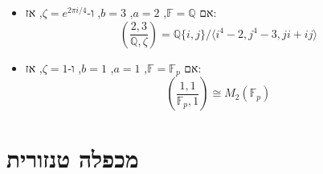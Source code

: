 \documentclass{tstextbook}
\begin{document}
\begin{example}
  \begin{itemize}
    \item אם \(\mathbb{F} = \mathbb{Q}\), \(a = 2\), \(b = 3\), ו-\(\zeta = e^{2\pi i / 4}\), אז:
$$\left( \frac{2, 3}{\mathbb{Q}, \zeta} \right) = \mathbb{Q}\{i, j\} / \langle i^4 - 2, j^4 - 3, ji + ij \rangle$$
    \item אם \(\mathbb{F} = \mathbb{F}_p\), \(a = 1\), \(b = 1\), ו-\(\zeta = 1\), אז:
$$\left( \frac{1, 1}{\mathbb{F}_p, 1} \right) \cong M_2(\mathbb{F}_p)$$
  \end{itemize}
\end{example}
\section{מכפלה טנזורית}
\end{document}
